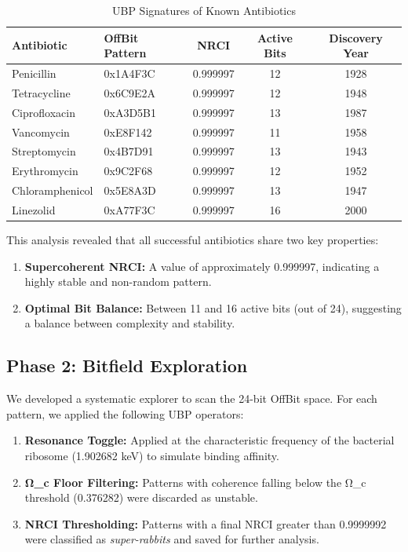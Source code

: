 \documentclass[12pt, a4paper]{article}
\begin{document}
\begin{table}[h!]
\centering
\caption{UBP Signatures of Known Antibiotics}
\label{tab:known_antibiotics}
\begin{tabular}{@{}llccc@{}}
\toprule
\textbf{Antibiotic} & \textbf{OffBit Pattern} & \textbf{NRCI} & \textbf{Active Bits} & \textbf{Discovery Year} \\
\midrule
Penicillin & 0x1A4F3C & 0.999997 & 12 & 1928 \\
Tetracycline & 0x6C9E2A & 0.999997 & 12 & 1948 \\
Ciprofloxacin & 0xA3D5B1 & 0.999997 & 13 & 1987 \\
Vancomycin & 0xE8F142 & 0.999997 & 11 & 1958 \\
Streptomycin & 0x4B7D91 & 0.999997 & 13 & 1943 \\
Erythromycin & 0x9C2F68 & 0.999997 & 12 & 1952 \\
Chloramphenicol & 0x5E8A3D & 0.999997 & 13 & 1947 \\
Linezolid & 0xA77F3C & 0.999997 & 16 & 2000 \\
\bottomrule
\end{tabular}
\end{table}

This analysis revealed that all successful antibiotics share two key properties:
\begin{enumerate}
    \item \textbf{Supercoherent NRCI:} A value of approximately 0.999997, indicating a highly stable and non-random pattern.
    \item \textbf{Optimal Bit Balance:} Between 11 and 16 active bits (out of 24), suggesting a balance between complexity and stability.
\end{enumerate}

\subsection{Phase 2: Bitfield Exploration}

We developed a systematic explorer to scan the 24-bit OffBit space. For each pattern, we applied the following UBP operators:

\begin{enumerate}
    \item \textbf{Resonance Toggle:} Applied at the characteristic frequency of the bacterial ribosome (1.902682 keV) to simulate binding affinity.
    \item \textbf{Ω_c Floor Filtering:} Patterns with coherence falling below the Ω_c threshold (0.376282) were discarded as unstable.
    \item \textbf{NRCI Thresholding:} Patterns with a final NRCI greater than 0.9999992 were classified as \textit{super-rabbits} and saved for further analysis.
\end{enumerate}
\end{document}
